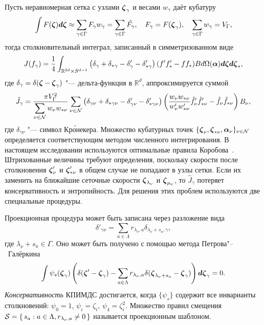 Пусть неравномерная сетка с узлами \({\boldsymbol{\zeta}}_\gamma\) и весами \(w_\gamma\) даёт кубатуру
\begin{equation*}
    \int F({\boldsymbol{\zeta}}) \boldsymbol{d\zeta} \approx \sum_{\gamma\in\Gamma} F_\gamma w_\gamma =
        \sum_{\gamma\in\Gamma} \hat{F_\gamma},
    \quad F_\gamma = F({\boldsymbol{\zeta}}_\gamma),
    \quad \sum_{\gamma\in\Gamma} w_\gamma = V_\Gamma,
\end{equation*}
тогда столкновительный интеграл, записанный в симметризованном виде
\begin{equation*}
    J(f_\gamma) = \frac14\int_{\mathbb{R}^{2d}\times S^{d-1}} \left(
        \delta_\gamma + \delta_{*\gamma} - \delta'_\gamma - \delta'_{*\gamma}
    \right) (f'f'_* - ff_*)B d\Omega(\boldsymbol{\alpha}) \boldsymbol{d\zeta}\boldsymbol{d\zeta}_*,
\end{equation*}
где \(\delta_\gamma = \delta({\boldsymbol{\zeta}}-{\boldsymbol{\zeta}}_\gamma)\) "--- дельта-функция в \(\mathbb{R}^d\),
аппроксимируется суммой
\begin{equation*}
    \hat{J}_\gamma = \frac{\pi V_\Gamma^2}{\displaystyle\sum_{\nu\in\mathcal{N}} w_{\nu}w_{*\nu}}
        \sum_{\nu\in\mathcal{N}} \left(
            \delta_{\gamma\nu} + \delta_{*\gamma\nu} - \delta'_{\gamma\nu} - \delta'_{*\gamma\nu}
        \right)\left(
            \frac{w_{\nu}w_{*\nu}}{w'_{\nu}w'_{*\nu}}
            \hat{f}'_{\nu}\hat{f}'_{*\nu} - \hat{f}_{\nu}\hat{f}_{*\nu}
        \right)B_\nu,
\end{equation*}
где \(\delta_{\gamma\nu}\) "--- символ Кр\'{о}некера.
Множество кубатурных точек \(\{{\boldsymbol{\zeta}}_\nu, {\boldsymbol{\zeta}}_{*\nu}, \boldsymbol{\alpha}_\nu\}_{\nu\in\mathcal{N}}\) определяется
соответствующим методом численного интегрирования.
В настоящем исследовании используются оптимальные правила Коробова~\autocite{Korobov1963}.
Штрихованные величины требуют определения,
поскольку скорости после столкновения \({\boldsymbol{\zeta}}'_\nu\) и \({\boldsymbol{\zeta}}'_{*\nu}\) в общем случае не попадают в узлы сетки.
Если их заменить на ближайшие сеточные скорости \({\boldsymbol{\zeta}}_{\lambda_\nu}\) и \({\boldsymbol{\zeta}}_{\mu_\nu}\),
то \(\hat{J}_\gamma\) потеряет консервативность и энтропийность.
Для решения этих проблем используются две специальные процедуры.

Проекционная процедура может быть записана через разложение вида
\begin{equation*}
    \delta'_{\gamma\nu} = \sum_{a\in\Lambda} r_{\lambda_\nu,a}\delta_{\lambda_\nu+s_a,\gamma},
\end{equation*}
где \(\lambda_\nu+s_a\in\Gamma\). Оно может быть получено с помощью метода Петрова"--~Галёркина
\begin{equation*}
    \int \psi_s({\boldsymbol{\zeta}}_\gamma) \left(
        \delta({\boldsymbol{\zeta}}'-{\boldsymbol{\zeta}}_\gamma)
        - \sum_{a\in\Lambda} r_{\lambda_\nu,a} \delta({\boldsymbol{\zeta}}_{\lambda_\nu+s_a}-{\boldsymbol{\zeta}}_\gamma)
    \right) \boldsymbol{d\zeta}_\gamma = 0.
\end{equation*}
\emph{Консервативность} КПИМДС достигается, когда \(\{\psi_s\}\) содержит все инварианты столкновений:
\(\psi_0 = 1\), \(\psi_i = \zeta_i\), \(\psi_4 = \zeta_i^2\).
Множество правил смещения \(\mathcal{S} = \{\,{s_a}:{a\in\Lambda, r_{\lambda_\nu,a}\neq0}\,\}\) называется проекционным шаблоном.

